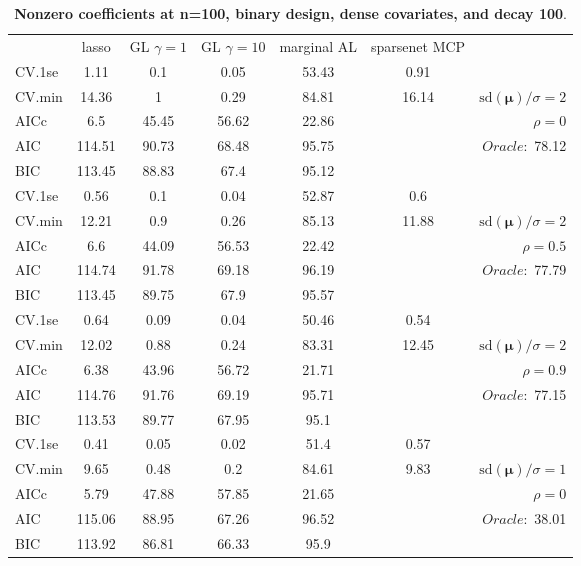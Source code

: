 \clearpage
\begin{table}\vspace{-.5cm}
\caption[l]{ { \bf Nonzero coefficients at n=100, binary design, 
dense covariates, and  decay  100}.}
\vspace{-.5cm}
\footnotesize{}
\begin{center}
\begin{tabular}{l*{5}{c}|r}
& lasso & GL $\gamma=1$ & GL $\gamma=10$ & marginal AL & sparsenet MCP  & \\
 \cline{1-7}
CV.1se & 1.11 & 0.1 & 0.05 & 53.43 & 0.91 & \\
CV.min & 14.36 & 1 & 0.29 & 84.81 & 16.14 &  $\mathrm{sd}(\mathbf{\mu})/\sigma=2$ \\
AICc & 6.5 & 45.45 & 56.62 & 22.86 & & $\rho=0$ \\
AIC & 114.51 & 90.73 & 68.48 & 95.75 & &  \multirow{2}{*}{$Oracle: $ 78.12} \\
BIC & 113.45 & 88.83 & 67.4 & 95.12 & &  \\
 \hline 
CV.1se & 0.56 & 0.1 & 0.04 & 52.87 & 0.6 & \\
CV.min & 12.21 & 0.9 & 0.26 & 85.13 & 11.88 &  $\mathrm{sd}(\mathbf{\mu})/\sigma=2$ \\
AICc & 6.6 & 44.09 & 56.53 & 22.42 & & $\rho=0.5$ \\
AIC & 114.74 & 91.78 & 69.18 & 96.19 & &  \multirow{2}{*}{$Oracle: $ 77.79} \\
BIC & 113.45 & 89.75 & 67.9 & 95.57 & &  \\
 \hline 
CV.1se & 0.64 & 0.09 & 0.04 & 50.46 & 0.54 & \\
CV.min & 12.02 & 0.88 & 0.24 & 83.31 & 12.45 &  $\mathrm{sd}(\mathbf{\mu})/\sigma=2$ \\
AICc & 6.38 & 43.96 & 56.72 & 21.71 & & $\rho=0.9$ \\
AIC & 114.76 & 91.76 & 69.19 & 95.71 & &  \multirow{2}{*}{$Oracle: $ 77.15} \\
BIC & 113.53 & 89.77 & 67.95 & 95.1 & &  \\
 \hline 
CV.1se & 0.41 & 0.05 & 0.02 & 51.4 & 0.57 & \\
CV.min & 9.65 & 0.48 & 0.2 & 84.61 & 9.83 &  $\mathrm{sd}(\mathbf{\mu})/\sigma=1$ \\
AICc & 5.79 & 47.88 & 57.85 & 21.65 & & $\rho=0$ \\
AIC & 115.06 & 88.95 & 67.26 & 96.52 & &  \multirow{2}{*}{$Oracle: $ 38.01} \\
BIC & 113.92 & 86.81 & 66.33 & 95.9 & &  \\

\end{tabular}
\end{center}
\end{table}
